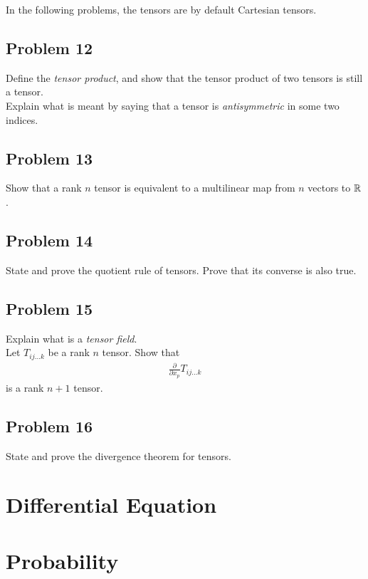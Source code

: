 \documentclass[a4paper]{article}
\begin{document}
In the following problems, the tensors are 
by default Cartesian tensors.

\subsection{Problem 12}
Define the \emph{tensor product}, and show that the tensor product of two tensors is still a tensor.\\
Explain what is meant by saying that a tensor is \emph{antisymmetric} in some two indices.

\subsection{Problem 13}
Show that a rank $n$ tensor is equivalent to a multilinear map from $n$ vectors to $\mathbb{R}$.

\subsection{Problem 14}
State and prove the quotient rule of tensors. Prove that its converse is also true.

\subsection{Problem 15}
Explain what is a \emph{tensor field}.\\
Let $T_{ij...k}$ be a rank $n$ tensor. Show that
\begin{equation*}
\begin{aligned}
\frac{\partial}{\partial x_p} T_{ij...k}
\end{aligned}
\end{equation*}
is a rank $n+1$ tensor.

\subsection{Problem 16}
State and prove the divergence theorem for tensors.

\newpage

\section{Differential Equation}

\newpage

\section{Probability}
\end{document}
